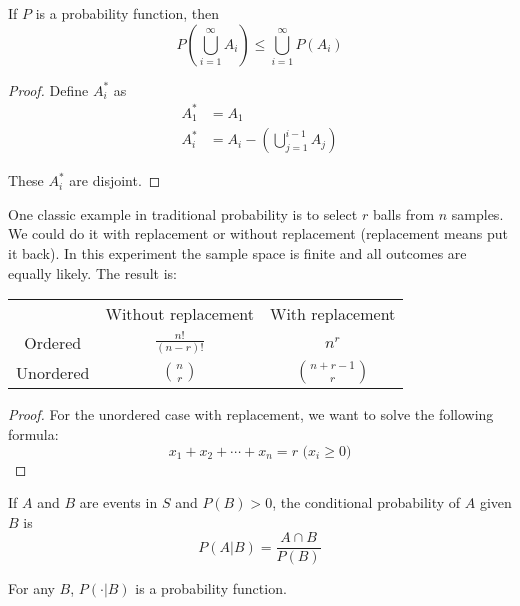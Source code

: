 \begin{theorem}
    If $P$ is a probability function, then
    \begin{equation}
        P\left(\bigcup_{i=1}^\infty A_i \right) \leq \bigcup_{i=1}^\infty P(A_i)
    \end{equation}
\end{theorem}
\begin{proof}
    Define $A_i^*$ as
    \begin{equation*}
        \begin{aligned}
            A_1^* &= A_1 \\
            A_i^* &= A_i - \left(\bigcup_{j=1}^{i-1} A_j \right)
        \end{aligned}
    \end{equation*}
    
    These $A_i^*$ are disjoint.
\end{proof}


One classic example in traditional probability is to select $r$ balls from $n$ samples. We could do it with replacement or without replacement (replacement means put it back). In this experiment the sample space is finite and all outcomes are equally likely. The result is:

\begin{table}[H]
\centering
\begin{tabular}[t]{ccc}
\hline
 & Without replacement & With replacement \\
Ordered & $\displaystyle \frac{n!}{(n-r)!}$ & $n^r$ \\ 
Unordered & $\displaystyle {n \choose r}$ & $\displaystyle {{n + r -1} \choose r}$ \\
\hline
\end{tabular}
\end{table}
\begin{proof}
    For the unordered case with replacement, we want to solve the following formula:
    \begin{equation}
        x_1 + x_2 + \cdots + x_n = r \text{ (} x_i \geq 0 \text{)}
    \end{equation}
\end{proof}


\begin{definition}
    If $A$ and $B$ are events in $S$ and $P(B) > 0$, the conditional probability of $A$ given $B$ is
    \begin{equation}
        P(A|B) = \frac{A \cap B}{P(B)}
    \end{equation}
    
    For any $B$, $P(\cdot|B)$ is a probability function.
\end{definition}


